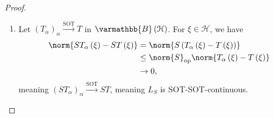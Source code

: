 \documentclass[10pt]{mypackage}
\renewcommand*{\mathbb}[1]{\varmathbb{#1}}
\newcommand{\B}{\mathbb{B}}
\begin{document}
\begin{proof}\hfill
  \begin{enumerate}[(1)]
    \item Let $\left(T_{\alpha}\right)_{\alpha}\xrightarrow{\text{SOT}}T$ in $\B\left(\mathcal{H}\right)$. For $\xi\in \mathcal{H}$, we have
      \begin{align*}
        \norm{ST_{\alpha}\left(\xi\right) - ST\left(\xi\right)} &= \norm{S\left(T_{\alpha}\left(\xi\right) - T\left(\xi\right)\right)}\\
                                                                &\leq \norm{S}_{\text{op}}\norm{T_{\alpha}\left(\xi\right) - T\left(\xi\right)}\\
                                                                &\rightarrow 0,
      \end{align*}
      meaning $\left(ST_{\alpha}\right)_{\alpha}\xrightarrow{\text{SOT}}ST$, meaning $L_S$ is SOT-SOT-continuous.\newline


\end{enumerate}
\end{proof}
\end{document}
